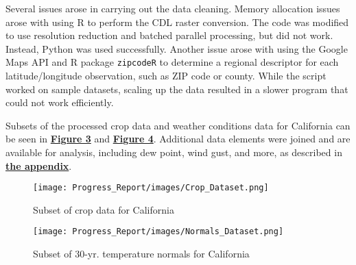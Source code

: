 \documentclass{article}
\begin{document}
Several issues arose in carrying out the data cleaning. Memory allocation issues arose with using R to perform the CDL raster conversion. The code was modified to use resolution reduction and batched parallel processing, but did not work. Instead, Python was used successfully. Another issue arose with using the Google Maps API and R package \texttt{zipcodeR} to determine a regional descriptor for each latitude/longitude observation, such as ZIP code or county. While the script worked on sample datasets, scaling up the data resulted in a slower program that could not work efficiently.

Subsets of the processed crop data and weather conditions data for California can be seen in \textbf{\hyperref[sec:cropsubset]{Figure 3}} and \textbf{\hyperref[sec:weathersubset]{Figure 4}}. Additional data elements were joined and are available for analysis, including dew point, wind gust, and more, as described in \textbf{\hyperref[sec:curated]{the appendix}}. \\

\begin{figure}[H]
\vspace*{-5mm}
\label{sec:cropsubset}
\centering
\texttt{[image: Progress\_Report/images/Crop\_Dataset.png]}
\vspace*{-5mm}
\caption{Subset of crop data for California}
\end{figure}

\begin{figure}[H]
\vspace*{-5mm}
\label{sec:weathersubset}
\centering
\texttt{[image: Progress\_Report/images/Normals\_Dataset.png]}
\vspace*{-5mm}
\caption{Subset of 30-yr. temperature normals for California}
\end{figure}
\end{document}
